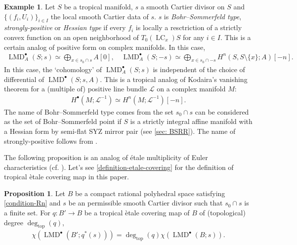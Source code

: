 \documentclass[a4paper,dvipdfmx,reqno,12pt]{amsart}
\theoremstyle{definition}
\newtheorem{example}[theorem]{Example}
\newtheorem{proposition}[theorem]{Proposition}
\newcommand{\mcal}[1]{\mathcal{#1}}%
\newcommand{\opn}[1]{\operatorname{#1}}
\numberwithin{equation}{section}
\begin{document}
\begin{example}
\label{example-tropical-kodaira-vanishing}
Let $S$ be a tropical manifold, 
$s$ a smooth Cartier divisor on $S$ 
and $\{(f_i,U_i)\}_{i\in I}$ the local smooth 
Cartier data of $s$. 
$s$ is 
\emph{Bohr--Sommerfeld type},
\emph{strongly-positive}
or \emph{Hessian type} if every
$f_i$ is locally a resctriction of a strictly convex 
function on an open neighborhood of $T_0(\opn{LC}_x)S$ 
for any $i\in I$. 
This is a certain analog of positive form on
complex manifolds. In this case, 
\begin{align}
\opn{LMD}^{\bullet}_{A}(S;s)\simeq 
\bigoplus_{x\in s_0 \cap s} A[0], \quad
\opn{LMD}^{\bullet}_{A}(S;-s)\simeq 
\bigoplus_{x\in s_0\cap -s} 
H^{n}(S,S\setminus\{x\};A)[-n].
\end{align}
In this case, the `cohomology' of 
$\opn{LMD}^{\bullet}_{A}(S;s)$ is independent of the choice of 
differential of $\opn{LMD}^{\bullet}(S;s,A)$.
This is a tropical analog of Kodaira's vanishing theorem
for a (multiple of) positive line bundle
$\mathcal{L}$ on a complex manifold $M$: 
\begin{align}
H^{\bullet}(M;\mcal{L}^{-1})\simeq H^{n}(M;\mcal{L}^{-1})[-n].
\end{align}
The name of Bohr--Sommerfeld type comes from 
the set $s_0\cap s$ can be considered as the set of 
Bohr--Sommerfeld point if $S$ is a strictly integral affine manifold 
with a Hessian form by semi-flat SYZ mirror pair
(see \cref{sec: BSRR}).
The name of strongly-positive follows 
from \cite{MR2892935}.
\end{example}

The following proposition is an analog of \'{e}tale multiplicity of Euler characteristics
(cf. \cite[Proposition 1.1.28]{MR2095471}).
Let's see \cref{definition-etale-covering} for 
the definition of tropical \`etale covering 
map in this paper.
\begin{proposition}
\label{proposition-euler-number-etale}
Let $B$ be a compact rational polyhedral space satisfying
\cref{condition-Rn} and $s$ be an permissible smooth Cartier divisor
such that $s_0\cap s$ is a finite set.
For $q \colon B' \to B$ be a tropical \`etale covering 
map of $B$ of 
(topological) degree 
$\opn{deg}_{\opn{top}}(q)$,
\begin{align}
\chi(\opn{LMD}^{\bullet}(B';q^{*}(s)))=
\opn{deg}_{\opn{top}}(q)\chi(\opn{LMD}^{\bullet}(B;s)).
\end{align}
\end{proposition}
\end{document}
